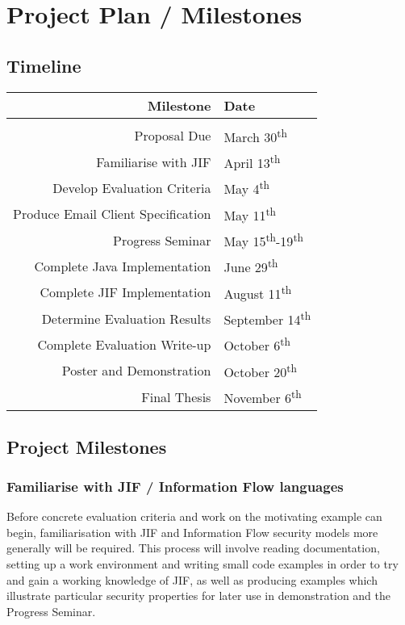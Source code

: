 \section{Project Plan / Milestones}

\subsection{Timeline}

\begin{tabular}{r|l}
	Milestone & Date \\\hline\\
	Proposal Due & March 30\textsuperscript{th} \\
	Familiarise with JIF & April 13\textsuperscript{th} \\
	Develop Evaluation Criteria & May 4\textsuperscript{th} \\
	Produce Email Client Specification & May 11\textsuperscript{th} \\
	Progress Seminar & May 15\textsuperscript{th}-19\textsuperscript{th} \\
	Complete Java Implementation & June 29\textsuperscript{th} \\
	Complete JIF Implementation & August 11\textsuperscript{th} \\
	Determine Evaluation Results & September 14\textsuperscript{th} \\
	Complete Evaluation Write-up & October 6\textsuperscript{th}\\
	Poster and Demonstration & October 20\textsuperscript{th} \\
	Final Thesis & November 6\textsuperscript{th} \\
\end{tabular}

\subsection{Project Milestones}

\subsubsection{Familiarise with JIF / Information Flow languages}

Before concrete evaluation criteria and work on the motivating example can begin, familiarisation with JIF and Information Flow security models more generally will be required. This process will involve reading documentation, setting up a work environment and writing small code examples in order to try and gain a working knowledge of JIF, as well as producing examples which illustrate particular security properties for later use in demonstration and the Progress Seminar.

